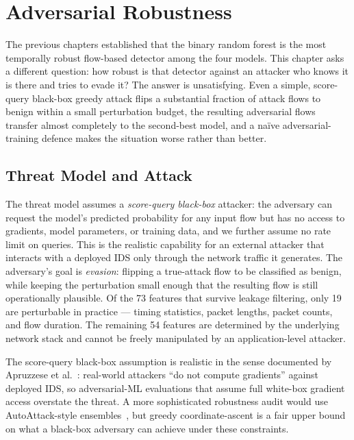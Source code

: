 \chapter{Adversarial Robustness}
\label{ch:adversarial}

The previous chapters established that the binary random forest is the
most temporally robust flow-based detector among the four models. This
chapter asks a different question: how robust is that detector against
an attacker who knows it is there and tries to evade it? The answer is
unsatisfying. Even a simple, score-query black-box greedy attack flips
a substantial fraction of attack flows to benign within a small
perturbation budget, the resulting adversarial flows transfer almost
completely to the second-best model, and a naïve adversarial-training
defence makes the situation worse rather than better.

\section{Threat Model and Attack}

The threat model assumes a \emph{score-query black-box} attacker: the
adversary can request the model's predicted probability for any input
flow but has no access to gradients, model parameters, or training data,
and we further assume no rate limit on queries. This is the realistic
capability for an external attacker that interacts with a deployed IDS
only through the network traffic it generates. The adversary's goal is
\textit{evasion}: flipping a true-attack flow to be classified as
benign, while keeping the perturbation small enough that the resulting
flow is still operationally plausible. Of the 73 features that survive
leakage filtering, only 19 are perturbable in practice --- timing
statistics, packet lengths, packet counts, and flow duration. The
remaining 54 features are determined by the underlying network stack
and cannot be freely manipulated by an application-level attacker.

The score-query black-box assumption is realistic in the sense documented
by Apruzzese et al.~\cite{Apruzzese2023}: real-world attackers ``do not
compute gradients'' against deployed IDS, so adversarial-ML evaluations
that assume full white-box gradient access overstate the threat. A more
sophisticated robustness audit would use AutoAttack-style
ensembles~\cite{Croce2020}, but greedy coordinate-ascent is a fair upper
bound on what a black-box adversary can achieve under these constraints.

